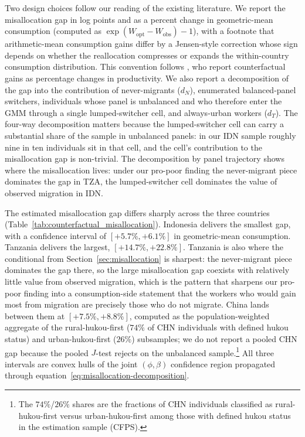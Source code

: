 Two design choices follow our reading of the existing literature.
We report the misallocation gap in log points and as a percent change in geometric-mean consumption (computed as $\exp(W_{\text{opt}} - W_{\text{obs}}) - 1$), with a footnote that arithmetic-mean consumption gains differ by a Jensen-style correction whose sign depends on whether the reallocation compresses or expands the within-country consumption distribution.
This convention follows \cite{bryanAggregateProductivityEffects2019}, who report counterfactual gains as percentage changes in productivity.
We also report a decomposition of the gap into the contribution of never-migrants ($d_N$), enumerated balanced-panel switchers, individuals whose panel is unbalanced and who therefore enter the GMM through a single lumped-switcher cell, and always-urban workers ($d_T$).
The four-way decomposition matters because the lumped-switcher cell can carry a substantial share of the sample in unbalanced panels: in our IDN sample roughly nine in ten individuals sit in that cell, and the cell's contribution to the misallocation gap is non-trivial.
The decomposition by panel trajectory shows where the misallocation lives: under our pro-poor finding the never-migrant piece dominates the gap in TZA, the lumped-switcher cell dominates the value of observed migration in IDN.

The estimated misallocation gap differs sharply across the three countries (Table~\ref{tab:counterfactual_misallocation}).
Indonesia delivers the smallest gap, with a confidence interval of $[+5.7\%, +6.1\%]$ in geometric-mean consumption.
Tanzania delivers the largest, $[+14.7\%, +22.8\%]$.
Tanzania is also where the conditional from Section~\ref{sec:misallocation} is sharpest: the never-migrant piece dominates the gap there, so the large misallocation gap coexists with relatively little value from observed migration, which is the pattern that sharpens our pro-poor finding into a consumption-side statement that the workers who would gain most from migration are precisely those who do not migrate.
China lands between them at $[+7.5\%, +8.8\%]$, computed as the population-weighted aggregate of the rural-hukou-first ($74\%$ of CHN individuals with defined hukou status) and urban-hukou-first ($26\%$) subsamples; we do not report a pooled CHN gap because the pooled $J$-test rejects on the unbalanced sample.\footnote{The $74\%$/$26\%$ shares are the fractions of CHN individuals classified as rural-hukou-first versus urban-hukou-first among those with defined hukou status in the estimation sample (CFPS).}
All three intervals are convex hulls of the joint $(\phi, \beta)$ confidence region propagated through equation~\eqref{eq:misallocation-decomposition}.


